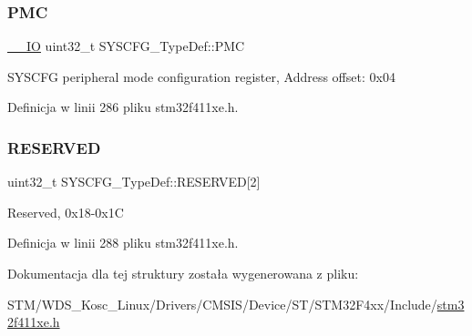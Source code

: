 \mbox{\label{struct_s_y_s_c_f_g___type_def_ab5c47c570566cb8ff9d0436c17cc9241}} 
\subsubsection{\texorpdfstring{P\+MC}{PMC}}
{\footnotesize\ttfamily \hyperlink{core__sc300_8h_aec43007d9998a0a0e01faede4133d6be}{\+\_\+\+\_\+\+IO} uint32\+\_\+t S\+Y\+S\+C\+F\+G\+\_\+\+Type\+Def\+::\+P\+MC}

S\+Y\+S\+C\+FG peripheral mode configuration register, Address offset\+: 0x04 

Definicja w linii 286 pliku stm32f411xe.\+h.

\mbox{\label{struct_s_y_s_c_f_g___type_def_a43926e6d31a976a0018b2d1f5c92645d}} 
\subsubsection{\texorpdfstring{R\+E\+S\+E\+R\+V\+ED}{RESERVED}}
{\footnotesize\ttfamily uint32\+\_\+t S\+Y\+S\+C\+F\+G\+\_\+\+Type\+Def\+::\+R\+E\+S\+E\+R\+V\+ED\mbox{[}2\mbox{]}}

Reserved, 0x18-\/0x1C 

Definicja w linii 288 pliku stm32f411xe.\+h.



Dokumentacja dla tej struktury została wygenerowana z pliku\+:\begin{DoxyCompactItemize}
\item 
S\+T\+M/\+W\+D\+S\+\_\+\+Kosc\+\_\+\+Linux/\+Drivers/\+C\+M\+S\+I\+S/\+Device/\+S\+T/\+S\+T\+M32\+F4xx/\+Include/\hyperlink{stm32f411xe_8h}{stm32f411xe.\+h}\end{DoxyCompactItemize}
